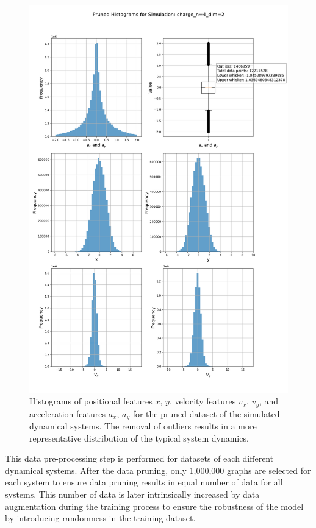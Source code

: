 \documentclass{article}
\begin{document}
\begin{figure}[H]
    \centering
    \includegraphics[width=\textwidth]{Data_Pruning/pruned_hist_charge_n=4_dim=2.png}
    \caption{Histograms of positional features $x$, $y$, velocity features $v_x$, $v_y$, and acceleration features $a_x$, $a_y$ for the pruned dataset of the simulated dynamical systems. The removal of outliers results in a more representative distribution of the typical system dynamics.}
    \label{fig:histogram2}
\end{figure}


This data pre-processing step is performed for datasets of each different dynamical systems. After the data pruning, only 1,000,000 graphs are selected for each system to ensure data pruning results in equal number of data for all systems. This number of data is later intrinsically increased by data augmentation during the training process to ensure the robustness of the model by introducing randomness in the training dataset.
\end{document}
